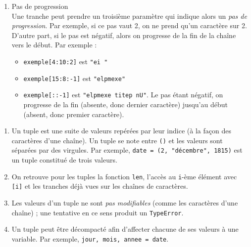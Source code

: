 \documentclass[11pt,a4paper]{article}
\begin{document}
\begin{tcolorbox}[left=0cm,title=\bf{\faPython \; Tranches},colbacktitle=cfond]
\begin{enumerate}
\begin{itemize}
  \item[\textbullet] \texttt{exemple[13:]} est {\tt "ple"} (la fin étant absente, on termine au dernier caractère)
 \end{itemize}	
\item[\ding{184}] Pas de progression \\
Une tranche peut prendre un troisième paramètre qui indique alors un \textit{pas de progression}. Par exemple, si ce pas vaut 2, on ne prend qu'un caractère sur 2. D'autre part, si le pas est négatif, alors on progresse de la fin de la chaîne vers le début. Par exemple :
\begin{itemize}
    \item[\textbullet] \texttt{exemple[4:10:2]} est {\tt "ei "}
    \item[\textbullet] \texttt{exemple[15:8:-1]} est {\tt "elpmexe"} 
    \item[\textbullet] \texttt{exemple[::-1]} est {\tt "elpmexe titep nU"}. Le pas étant négatif, on progresse de la fin (absente, donc dernier caractère) jusqu'au début (absent, donc premier caractère).
\end{itemize}	
\end{enumerate}
\end{tcolorbox}

\begin{tcolorbox}[left=0cm,title=\bf{\faPython \; Tuples},colbacktitle=cfond]
    \begin{enumerate}
        \item[\ding{182}] Un tuple est une suite de valeurs repérées par leur indice (à la façon des caractères d'une chaîne). Un tuple se note entre {\tt ()} et les valeurs sont séparées par des virgules. Par exemple, \texttt{date = (2, "décembre", 1815)} est un tuple constitué de trois valeurs.
        \item[\ding{183}] On retrouve pour les tuples la fonction {\tt len}, l'accès au {\tt i}-ème élément avec {\tt [i]} et les tranches déjà vues sur les chaînes de caractères.
        \item[\ding{184}] Les valeurs d'un tuple ne sont \textit{pas modifiables} (comme les caractères d'une chaîne) ; une tentative en ce sens produit un {\tt TypeError}.
        \item[\ding{185}] Un tuple peut être décompacté afin d'affecter chacune de ses valeurs à une variable. Par exemple, \texttt{jour, mois, annee = date}.
    \end{enumerate}
\end{tcolorbox}
\end{document}
